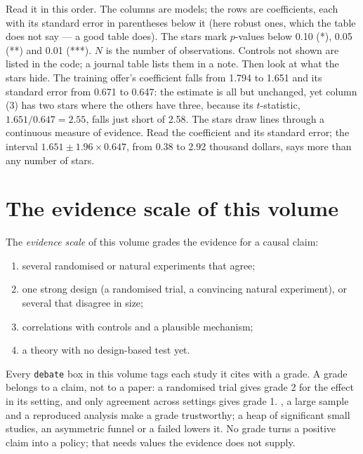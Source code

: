 \label{out:b3:credible-empirical-work:table}

Read it in this order. The columns are models; the rows are coefficients, each
with its standard error in parentheses below it (here robust ones, which the
table does not say --- a good table does). The stars mark $p$-values below 0.10
(*), 0.05 (**) and 0.01 (***). $N$ is the number of observations. Controls not
shown are listed in the code; a journal table lists them in a note. Then look at
what the stars hide. The training offer's coefficient falls from 1.794 to 1.651
and its standard error from 0.671 to 0.647: the estimate is all but unchanged,
yet column (3) has two stars where the others have three, because its
$t$-statistic, $1.651/0.647 = 2.55$, falls just short of 2.58. %
The stars draw lines through a continuous measure of evidence. Read the
coefficient and its standard error; the interval
$1.651 \pm 1.96 \times 0.647$, from 0.38 to 2.92 thousand dollars, says more than
any number of stars.

\section{The evidence scale of this volume}\label{sec:b3:credible-empirical-work:scale}

\begin{definition}\label{def:b3:credible-empirical-work:evidence-scale}
The \emph{evidence scale} of this volume grades the evidence for a causal claim:
\begin{enumerate}
\item several randomised or natural experiments that agree;
\item one strong design (a randomised trial, a convincing natural experiment), or
several that disagree in size;
\item correlations with controls and a plausible mechanism;
\item a theory with no design-based test yet.
\end{enumerate}
\end{definition}

\begin{measure}
Every \texttt{debate} box in this volume tags each study it cites with a grade.
A grade belongs to a claim, not to a paper: a randomised trial gives grade 2 for
the effect in its setting, and only agreement across settings gives grade 1.
, a large sample and a reproduced analysis make a grade
trustworthy; a heap of significant small studies, an asymmetric funnel or a
failed  lowers it. No grade turns a positive claim into a policy;
that needs values the evidence does not supply.
\end{measure}

